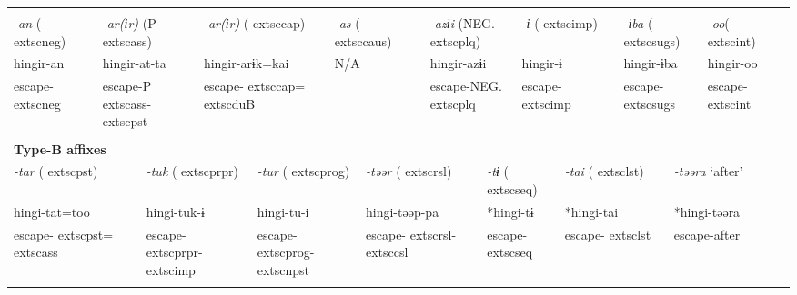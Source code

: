 \tabletail{}
\tablelasttail{}
\begin{tabularx}{\textwidth}{XXXXXXXXXXXXXXXXXXXXXXX}
\lsptoprule
\multicolumn{23}{X}{{\bfseries Type-A affixes}}\\
{ \textit{{}-an} (	extsc{neg})} & \multicolumn{5}{X}{{ \textit{{}-ar(ɨr)} (P	extsc{ass})}} & \multicolumn{4}{X}{{ \textit{{}-ar(ɨr)} (	extsc{cap})}} & \multicolumn{4}{X}{{ \textit{{}-as} (	extsc{caus})}} & \multicolumn{3}{X}{{ \textit{{}-azɨi} (NEG.	extsc{plq})}} & \multicolumn{2}{X}{{ \textit{{}-ɨ} (	extsc{imp})}} & \multicolumn{2}{X}{{ \textit{{}-ɨba} (	extsc{sugs})}} & { \textit{{}-oo}(	extsc{int})} & \\
{ hingir-an} & \multicolumn{5}{X}{{ hingir-at-ta}} & \multicolumn{4}{X}{{ hingir-arɨk=kai}} & \multicolumn{4}{X}{{ N/A\footnotemark{}}} & \multicolumn{3}{X}{{ hingir-azɨi}} & \multicolumn{2}{X}{{ hingir-ɨ}} & \multicolumn{2}{X}{{ hingir-ɨba}} & { hingir-oo} & \\
escape-	extsc{neg} & \multicolumn{5}{X}{escape-P	extsc{ass}-	extsc{pst}} & \multicolumn{4}{X}{escape-	extsc{cap}=	extsc{du}B} & \multicolumn{4}{X}{} & \multicolumn{3}{X}{escape-NEG.	extsc{plq}} & \multicolumn{2}{X}{escape-	extsc{imp}} & \multicolumn{2}{X}{escape-	extsc{sugs}} & escape-	extsc{int} & \\
\multicolumn{23}{X}{}\\
\multicolumn{23}{X}{{\bfseries Type-B affixes}}\\
\multicolumn{3}{X}{{ \textit{{}-tar} (	extsc{pst})}} & \multicolumn{5}{X}{{ \textit{{}-tuk} (	extsc{prpr})}} & \multicolumn{4}{X}{{ \textit{{}-tur} (	extsc{prog})}} & \multicolumn{3}{X}{{ \textit{{}-təər} (	extsc{rsl})}} & \multicolumn{3}{X}{{ \textit{{}-tɨ} (	extsc{seq})}} & \multicolumn{2}{X}{{ \textit{{}-tai} (	extsc{lst})}} & \multicolumn{3}{X}{{ \textit{{}-təəra} ‘after’}}\\
\multicolumn{3}{X}{{ hingi-tat=too}} & \multicolumn{5}{X}{{ hingi-tuk-ɨ}} & \multicolumn{4}{X}{{ hingi-tu-i}} & \multicolumn{3}{X}{{ hingi-təəp-pa}} & \multicolumn{3}{X}{{ *hingi-tɨ}} & \multicolumn{2}{X}{{ *hingi-tai}} & \multicolumn{3}{X}{{ *hingi-təəra}}\\
\multicolumn{3}{X}{escape-	extsc{pst}=	extsc{ass}} & \multicolumn{5}{X}{escape-	extsc{prpr}-	extsc{imp}} & \multicolumn{4}{X}{escape-	extsc{prog}-	extsc{npst}} & \multicolumn{3}{X}{escape-	extsc{rsl}-	extsc{csl}} & \multicolumn{3}{X}{escape-	extsc{seq}} & \multicolumn{2}{X}{escape-	extsc{lst}} & \multicolumn{3}{X}{escape-after}\\
\multicolumn{3}{X}{} & \multicolumn{5}{X}{} & \multicolumn{4}{X}{} & \multicolumn{3}{X}{} & \multicolumn{3}{X}{} & \multicolumn{2}{X}{} & \multicolumn{3}{X}{}\\

\end{tabularx}
